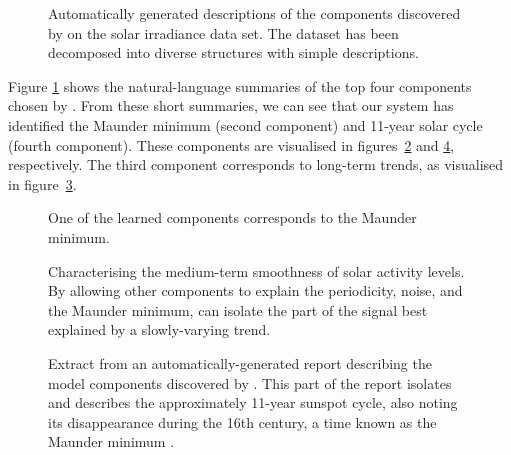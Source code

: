 \begin{figure}[h]
\centering
{}
\caption[Summaries generated by \procedurename{} for the solar irradiance data.]{
Automatically generated descriptions of the components discovered by \procedurename{} on the solar irradiance data set.
The dataset has been decomposed into diverse structures with simple descriptions.}
\label{fig:exec}
\end{figure}
Figure \ref{fig:exec} shows the natural-language summaries of the top four components chosen by \procedurename{}.
From these short summaries, we can see that our system has identified the Maunder minimum (second component) and 11-year solar cycle (fourth component).
These components are visualised in figures~\ref{fig:maunder} and \ref{fig:periodic}, respectively. 
The third component corresponds to long-term trends, as visualised in figure~\ref{fig:smooth}.

\begin{figure}[ht]
\centering
{}
\caption[Automatic identification of the Maunder minimum.]{One of the learned components corresponds to the Maunder minimum.}
\label{fig:maunder}
\end{figure}

\begin{figure}[h!]
\centering
{}
\caption[Characterising the medium-term smoothness of solar activity levels.]{Characterising the medium-term smoothness of solar activity levels.  By allowing other components to explain the periodicity, noise, and the Maunder minimum, \procedurename{} can isolate the part of the signal best explained by a slowly-varying trend.}
\label{fig:smooth}
\end{figure}

\begin{figure}[ht]
\centering
{}
\caption[Automatic identification of solar cycles.]{
Extract from an automatically-generated report describing the model components discovered by \procedurename{}.
This part of the report isolates and describes the approximately 11-year sunspot cycle, also noting its disappearance during the 16th century, a time known as the Maunder minimum \citep{Lean1995-vp}.
}
\label{fig:periodic}
\end{figure}

